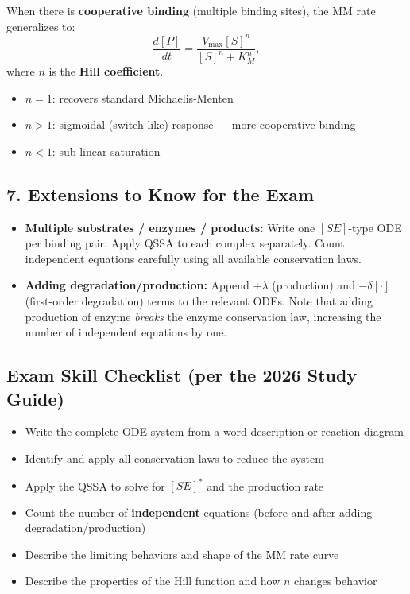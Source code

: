 \documentclass[12pt]{article}
\begin{document}
When there is \textbf{cooperative binding} (multiple binding sites), the MM rate generalizes to:
\[
  \frac{d[P]}{dt} = \frac{V_{\max}[S]^n}{[S]^n + K_M^n},
\]
where $n$ is the \textbf{Hill coefficient}.
\begin{itemize}[noitemsep]
  \item $n = 1$: recovers standard Michaelis-Menten
  \item $n > 1$: sigmoidal (switch-like) response --- more cooperative binding
  \item $n < 1$: sub-linear saturation
\end{itemize}

\subsection*{7. Extensions to Know for the Exam}

\begin{itemize}
  \item \textbf{Multiple substrates / enzymes / products:} Write one $[SE]$-type ODE per binding pair.
        Apply QSSA to each complex separately. Count independent equations carefully using all
        available conservation laws.
  \item \textbf{Adding degradation/production:} Append $+\lambda$ (production) and $-\delta[\cdot]$
        (first-order degradation) terms to the relevant ODEs. Note that adding production of
        enzyme \emph{breaks} the enzyme conservation law, increasing the number of independent
        equations by one.
\end{itemize}

\subsection*{Exam Skill Checklist (per the 2026 Study Guide)}

\begin{itemize}[noitemsep, label=$\square$]
  \item Write the complete ODE system from a word description or reaction diagram
  \item Identify and apply all conservation laws to reduce the system
  \item Apply the QSSA to solve for $[SE]^*$ and the production rate
  \item Count the number of \textbf{independent} equations (before and after adding degradation/production)
  \item Describe the limiting behaviors and shape of the MM rate curve
  \item Describe the properties of the Hill function and how $n$ changes behavior
\end{itemize}
\end{document}
